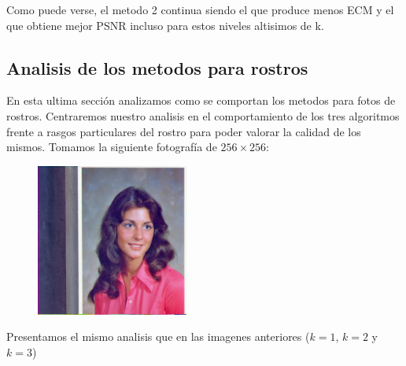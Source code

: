Como puede verse, el metodo 2 continua siendo el que produce menos ECM y el que obtiene mejor PSNR incluso para estos niveles altisimos de k.

\subsection{Analisis de los metodos para rostros}


En esta ultima sección analizamos como se comportan los metodos para fotos de rostros. Centraremos nuestro analisis en el comportamiento de los tres algoritmos frente a rasgos particulares del rostro para poder valorar la calidad de los mismos. Tomamos la siguiente fotografía de $256\times 256$:

\begin{figure}[H]
\centering
\includegraphics[width=5cm]{fotos/rostro/orig.png}
\end{figure}

Presentamos el mismo analisis que en las imagenes anteriores ($k=1$, $k=2$ y $k=3$)


